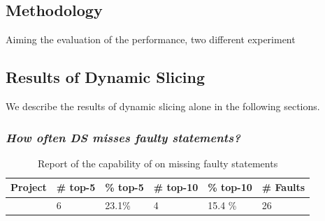 \documentclass{article}
\begin{document}


\subsection{Methodology}

Aiming the evaluation of the \comb{} performance, two different experiment 

\subsection{Results of Dynamic Slicing}

We describe the results of dynamic slicing alone in the following sections.

\subsubsection{\textit{How often DS misses faulty statements?}}


\begin{table}[h]
	\centering
	\setlength{\tabcolsep}{4pt}
	\begin{tabular}{llllll}
		\toprule
		Project             &  \# top-5  & \% top-5 & \# top-10 & \% top-10 & \# Faults \\ %
		\midrule
		\chart{}  & 6 & 23.1\% & 4 & 15.4 \%  & 26\\ %
		\bottomrule
	\end{tabular}
	\caption { Report of the capability of \ds{} on missing faulty statements}
\end{table}
\normalsize
\end{document}
